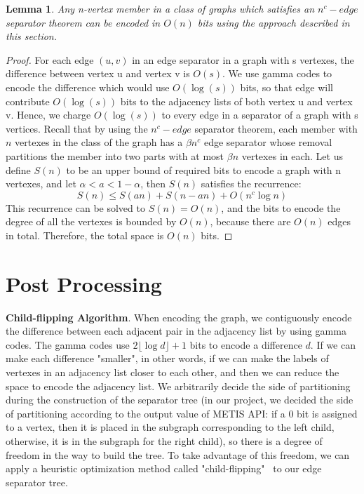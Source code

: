 \documentclass[12pt,glossary]{dalthesis}
\newtheorem{lemma}[theorem]{Lemma}
\begin{document}
\bigskip
\begin{lemma}
Any n-vertex member in a class of graphs which satisfies an $n^{c}-edge$ separator
theorem can be encoded in $O(n)$ bits using the approach described in this section.
\end{lemma}

\bigskip
\begin{proof}
For each edge $(u, v)$ in an edge separator in a graph with s vertexes, the difference
between vertex u and vertex v is $O(s)$. We use gamma codes to encode the difference which would use $O(\log (s))$ bits, so that edge will contribute $O(\log (s))$ bits to the adjacency lists of both vertex u and vertex v. Hence, we charge $O(\log (s))$ to every edge in a separator of a graph with s vertices. Recall that by using the $n^{c}- edge$ separator theorem, each member with $n$ vertexes in the class of the graph has a $\beta n^{c}$ edge separator whose removal partitions the member into two parts with at most $\beta n$ vertexes in each. Let us define $S(n)$ to be an upper bound of required bits to encode a graph with n vertexes, and let $\alpha < a < 1 - \alpha $, then $S(n)$ satisfies the recurrence:
\[ S(n) \leq S(an) + S(n-an) + O(n^{c} \log n) \]
This recurrence can be solved to $S(n) = O(n)$, and the bits to encode the degree of all the vertexes is bounded by $O(n)$, because there are $O(n)$ edges in total. Therefore, the total space is $O(n)$ bits.
\end{proof}

\bigskip
\bigskip

\section{Post Processing}

\textbf{Child-flipping Algorithm}. When encoding the graph, we contiguously encode the difference between each adjacent pair in the adjacency list by using gamma codes. The gamma codes use $2\lfloor \log d \rfloor + 1$ bits to encode a difference $d$. If we can make each difference "smaller", in other words, if we can make the labels of vertexes in an adjacency list closer to each other, and then we can reduce the space to encode the adjacency list. We arbitrarily decide the side of partitioning during the construction of the separator tree (in our project, we decided the side of partitioning according to the output value of METIS API: if a 0 bit is assigned to a vertex, then it is placed in the subgraph corresponding to the left child, otherwise, it is in the subgraph for the right child), so there is a degree of freedom in the way to build the tree. To take advantage of this freedom, we can apply a heuristic optimization method called "child-flipping"~\cite{compact-representation} to our edge separator tree.
\end{document}

